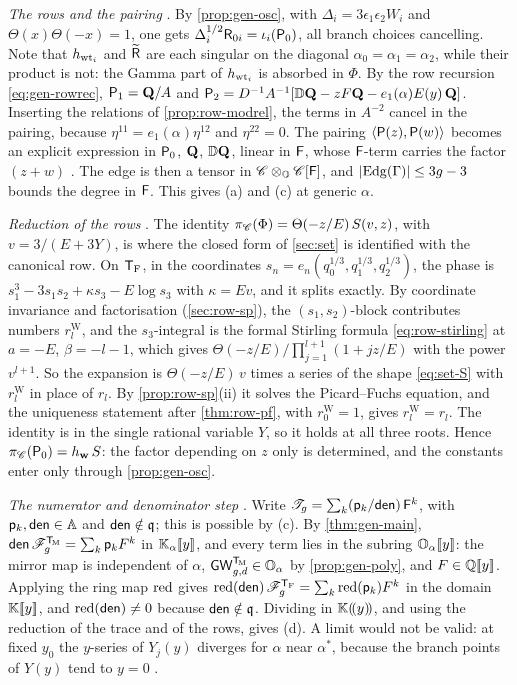 \emph{The rows and the pairing} . By \cref{prop:gen-osc}, with $\Delta_i=3\epsilon_1\epsilon_2W_i$ and $\Theta(x)\Theta(-x)=1$, one gets $\Delta_i^{1/2}\mathsf{R}_{0i}=\iota_i(\mathsf{P}_0)$, all branch choices cancelling. Note that $h_{\mathrm{wt}_i}$ and $\widetilde{\mathsf{R}}$ are each singular on the diagonal $\alpha_0=\alpha_1=\alpha_2$, while their product is not: the Gamma part of $h_{\mathrm{wt}_i}$ is absorbed in $\Phi$. By the row recursion \eqref{eq:gen-rowrec}, $\mathsf{P}_1=\mathbf{Q}/A$ and $\mathsf{P}_2=D^{-1}A^{-1}[\mathbb{D}\mathbf{Q}-zF\mathbf{Q}-e_1(\alpha)E(y)\,\mathbf{Q}]$. Inserting the relations of \cref{prop:row-modrel}, the terms in $A^{-2}$ cancel in the pairing, because $\eta^{11}=e_1(\alpha)\eta^{12}$ and $\eta^{22}=0$. The pairing $\langle\mathsf{P}(z),\mathsf{P}(w)\rangle$ becomes an explicit expression in $\mathsf{P}_0$, $\mathbf{Q}$, $\mathbb{D}\mathbf{Q}$, linear in $\mathsf{F}$, whose $\mathsf{F}$-term carries the factor $(z+w)$ . The edge is then a tensor in $\mathscr{C}\otimes_{\mathbb{O}}\mathscr{C}[\mathsf{F}]$, and $|\mathrm{Edg}(\Gamma)|\leq3g-3$ bounds the degree in $\mathsf{F}$. This gives \textup{(a)} and \textup{(c)} at generic $\alpha$.

\emph{Reduction of the rows} . The identity $\pi_{\mathscr{C}}(\Phi)=\Theta(-z/E)\,S(v,z)$, with $v=3/(E+3Y)$, is where the closed form of \cref{sec:set} is identified with the canonical row. On $\mathsf{T}_{\mathrm{F}}$, in the coordinates $s_n=e_n(q_0^{1/3},q_1^{1/3},q_2^{1/3})$, the phase is $s_1^3-3s_1s_2+\kappa s_3-E\log s_3$ with $\kappa=Ev$, and it splits exactly. By coordinate invariance and factorisation (\cref{sec:row-sp}), the $(s_1,s_2)$-block contributes numbers $r^{\mathrm{W}}_l$, and the $s_3$-integral is the formal Stirling formula \eqref{eq:row-stirling} at $a=-E$, $\beta=-l-1$, which gives $\Theta(-z/E)/\prod_{j=1}^{l+1}(1+jz/E)$ with the power $v^{l+1}$. So the expansion is $\Theta(-z/E)\,v$ times a series of the shape \eqref{eq:set-S} with $r^{\mathrm{W}}_l$ in place of $r_l$. By \cref{prop:row-sp}\textup{(ii)} it solves the Picard--Fuchs equation, and the uniqueness statement after \cref{thm:row-pf}, with $r^{\mathrm{W}}_0=1$, gives $r^{\mathrm{W}}_l=r_l$. The identity is in the single rational variable $Y$, so it holds at all three roots. Hence $\pi_{\mathscr{C}}(\mathsf{P}_0)=h_{\mathbf{w}}\,S$: the factor depending on $z$ only is determined, and the constants enter only through \cref{prop:gen-osc}.

\emph{The numerator and denominator step} . Write $\mathscr{T}_g=\sum_k(\mathsf{p}_k/\mathsf{den})\,\mathsf{F}^k$, with $\mathsf{p}_k,\mathsf{den}\in\mathbb{A}$ and $\mathsf{den}\notin\mathfrak{q}$; this is possible by \textup{(c)}. By \cref{thm:gen-main}, $\mathsf{den}\,\mathscr{F}_g^{\mathsf{T}_{\!\mathrm{M}}}=\sum_k\mathsf{p}_kF^k$ in $\mathbb{K}_{\alpha}[\![ y ]\!]$, and every term lies in the subring $\mathbb{O}_{\alpha}[\![ y ]\!]$: the mirror map is independent of $\alpha$, $\mathsf{GW}_{g,d}^{\mathsf{T}_{\!\mathrm{M}}}\in\mathbb{O}_{\alpha}$ by \cref{prop:gen-poly}, and $F\in\mathbb{Q}[\![ y ]\!]$. Applying the ring map $\mathrm{red}$ gives $\mathrm{red}(\mathsf{den})\,\mathscr{F}_g^{\mathsf{T}_{\mathrm{F}}}=\sum_k\mathrm{red}(\mathsf{p}_k)F^k$ in the domain $\mathbb{K}[\![ y ]\!]$, and $\mathrm{red}(\mathsf{den})\neq0$ because $\mathsf{den}\notin\mathfrak{q}$. Dividing in $\mathbb{K}(\!(y)\!)$, and using the reduction of the trace and of the rows, gives \textup{(d)}. A limit would not be valid: at fixed $y_0$ the $y$-series of $Y_j(y)$ diverges for $\alpha$ near $\alpha^*$, because the branch points of $Y(y)$ tend to $y=0$ .

